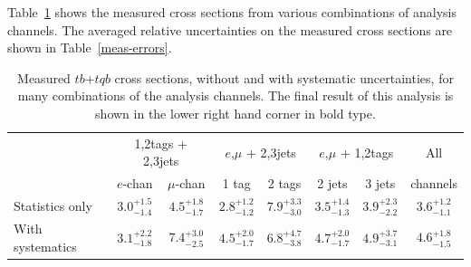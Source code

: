 Table~\ref{tab:measxsecs} shows the measured cross sections from various combinations of analysis channels.  The averaged relative uncertainties on the measured cross sections are shown in Table~\ref{meas-errors}.

\begin{table}[!h!tbp]
\begin{center}
\caption{Measured $tb$+$tqb$ cross sections, without and
with systematic uncertainties, for many combinations of the analysis
channels. The final result of this analysis is shown in the lower
right hand corner in bold type.}
\label{tab:measxsecs}
\begin{tabular}{l|cc|cc|cc|c}
& \multicolumn{2}{c|}{1,2tags + 2,3jets}& \multicolumn{2}{c|}{$e$,$\mu$ + 2,3jets}
& \multicolumn{2}{c|}{$e$,$\mu$ + 1,2tags}& All \\
                 &  $e$-chan & $\mu$-chan& 1 tag & 2 tags& 2 jets& 3 jets&channels\\
\hline
Statistics only  &  $3.0^{+1.5}_{-1.4}$  & $4.5^{+1.8}_{-1.7}$ & $2.8^{+1.2}_{-1.2}$ & $7.9^{+3.3}_{-3.0}$ & $3.5^{+1.4}_{-1.3}$ & $3.9^{+2.3}_{-2.2}$ & $3.6^{+1.2}_{-1.1}$     \\
With systematics &  $3.1^{+2.2}_{-1.8}$  & $7.4^{+3.0}_{-2.5}$ & $4.5^{+2.0}_{-1.7}$ & $6.8^{+4.7}_{-3.8}$ & $4.7^{+2.0}_{-1.7}$ & $4.9^{+3.7}_{-3.1}$ & $\mathbf{4.6^{+1.8}_{-1.5}}$     \\
\end{tabular}
\vspace{-0.1in}
\end{center}
\end{table}

